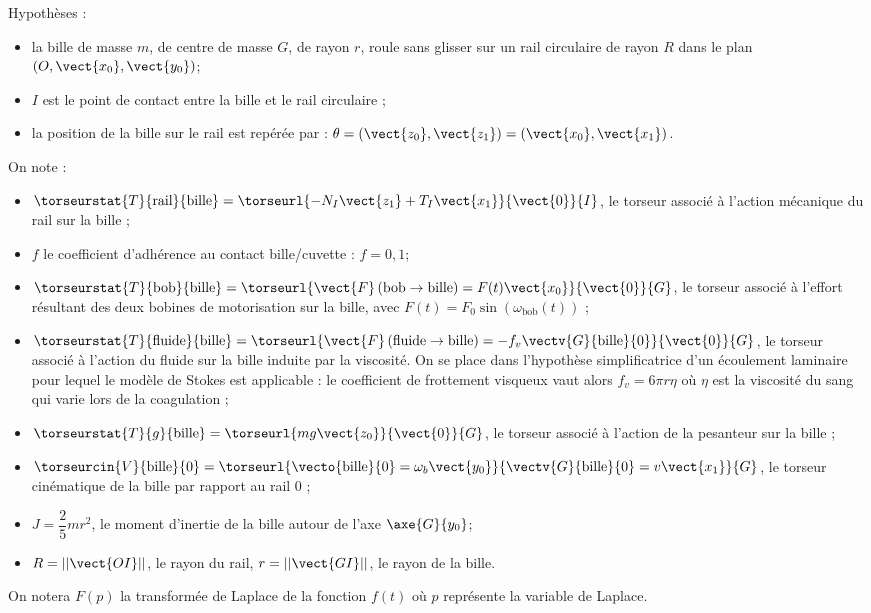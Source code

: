Hypothèses :
\begin{itemize}
\item la bille de masse $m$, de centre de masse $G$, de rayon $r$,
roule sans glisser sur un rail circulaire de rayon $R$ dans
le plan $\left(O,\vect{x_0},\vect{y_0}\right)$;
\item $I$ est le point de contact entre la bille et le rail circulaire ;
\item la position de la bille sur le rail est repérée par : $\theta = \left(\vect{z_0},\vect{z_1} \right)= \left(\vect{x_0},\vect{x_1} \right)$.
\end{itemize}

On note :
\begin{itemize}
\item $\torseurstat{T}{\text{rail}}{\text{bille}} = \torseurl{-N_I\vect{z_1}+T_I\vect{x_1}}{\vect{0}}{I}$, le torseur associé à l’action mécanique du rail sur la bille ;
\item $f$ le coefficient d’adhérence au contact bille/cuvette : $f=0,1$; 
\item $\torseurstat{T}{\text{bob}}{\text{bille}} = \torseurl{\vect{F}\left(\text{bob} \rightarrow \text{bille} \right)=F(t)\vect{x_0}}{\vect{0}}{G}$, le torseur associé à l’effort résultant des deux bobines de motorisation sur la bille, avec $F(t)=F_0\sin\left(\omega_{\text{bob}}(t)\right)$ ;
\item $\torseurstat{T}{\text{fluide}}{\text{bille}} = \torseurl{\vect{F}\left(\text{fluide} \rightarrow \text{bille} \right)=-f_v\vectv{G}{\text{bille}}{0}}{\vect{0}}{G}$, le torseur associé à
l’action du fluide sur la bille induite par la viscosité. On se place dans l’hypothèse
simplificatrice d’un écoulement laminaire pour lequel le modèle de Stokes est applicable : le
coefficient de frottement visqueux vaut alors $f_v = 6\pi r \eta $  où $\eta$ est la viscosité du sang qui
varie lors de la coagulation ;
\item $\torseurstat{T}{g}{\text{bille}} = \torseurl{mg\vect{z_0}}{\vect{0}}{G}$, le torseur associé à l’action de la pesanteur sur la bille ;
\item $\torseurcin{V}{\text{bille}}{0} = \torseurl{\vecto{\text{bille}}{0}=\omega_b \vect{y_0}}{\vectv{G}{\text{bille}}{0}=v\vect{x_1}}{G}$, le torseur cinématique de la bille par rapport au rail 0 ;
\item $J = \dfrac{2}{5}mr^2$, le moment d’inertie de la bille autour de l’axe $\axe{G}{y_0}$;
\item $R=||\vect{OI}||$, le rayon du rail, $r=||\vect{GI}||$, le rayon de la bille.
\end{itemize}
On notera $F(p)$ la transformée de Laplace de la fonction $f(t)$ où $p$ représente la variable de
Laplace.
\fi

